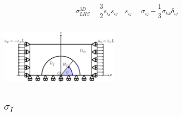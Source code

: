 \documentclass[first,firstsupp,lastsupp,last,hyperref,table]{ETHclass}
\begin{document}
\begin{frame}
\begin{columns}[c]
\begin{column}{0.5\textwidth}
\begin{figure}
\end{figure}
\scriptsize
\begin{equation*}
\sigma^{3D}_{LHS}=\frac{3}{2}s_{ij}s_{ij}\quad s_{ij}=\sigma_{ij}-\frac{1}{3}\sigma_{kk}\delta_{ij}
\end{equation*}
\end{column}
\end{columns}
\vspace{-0.3cm}
\includegraphics[width=0.45\textwidth]{refAngle.pdf}
\end{frame}

\subsection{$\sigma_{I}$}
\end{document}
